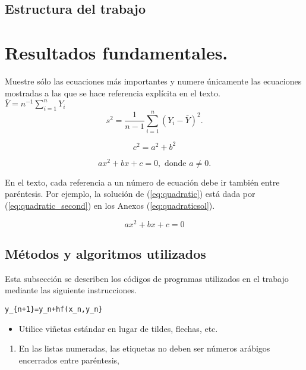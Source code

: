 \documentclass{wscpaperproc}
\theoremstyle{wsc}
\begin{document}
\subsection{Estructura del trabajo}

\section{Resultados fundamentales.}

Muestre s\'olo las ecuaciones m\'as importantes y
numere \'unicamente las ecuaciones mostradas a las que se hace referencia expl\'icita en el texto. \\

$\bar Y = n^{-1} \sum_{i=1}^n Y_i$\\
$$s^2 = \frac 1 {n-1} \sum_{i=1}^n (Y_i - \bar Y)^2.$$

\[
	c^2=a^2+b^2
\]

\begin{equation}\label{eq:quadratic}
	ax^2 + bx + c = 0, \mbox{ donde } a \ne 0.
\end{equation}

En el texto, cada referencia a un n\'umero de ecuaci\'on debe ir tambi\'en entre par\'entesis. Por ejemplo, la soluci\'on de (\ref{eq:quadratic}) est\'a dada por (\ref{eq:quadratic_second}) en los Anexos (\ref{eq:quadraticsol}).


\begin{equation} \label{eq:quadratic_second}
	ax^2 + bx + c = 0
\end{equation}


\subsection{M\'etodos y algoritmos utilizados}
Esta  subsecci\'on se describen los c\'odigos de programas utilizados en el trabajo mediante las siguiente instrucciones.

\begin{verbatim}
y_{n+1}=y_n+hf(x_n,y_n}
\end{verbatim}


\begin{itemize}
	\item Utilice vi\~netas est\'andar en lugar de tildes, flechas, etc.
\end{itemize}
\begin{enumerate}
	\item En las listas numeradas, las etiquetas no deben ser n\'umeros ar\'abigos encerrados entre par\'entesis,
\end{enumerate}
\end{document}
